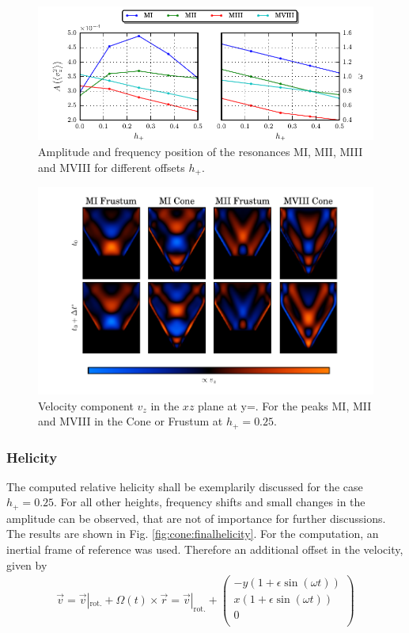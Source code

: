 \begin{figure}[!tp]
  \centering
  \includegraphics{gfx/cone/final/amp_pos.pdf}
  \caption{
      \label{fig:cone:finalampmax}Amplitude and frequency position of the resonances M\RN{1}, M\RN{2}, M\RN{3} and M\RN{8}
      for different offsets $h_+$.
    }
\end{figure}
\begin{figure}[!bp]
  \centering
  \includegraphics{gfx/cone/final/modes.pdf}
  \caption{
      \label{fig:cone:finalmodesexp}
      Velocity component $v_z$ in the $xz$ plane at y=.
       For the peaks M\RN{1}, M\RN{2} and M\RN{8} in the Cone or Frustum at $h_+=0.25$.
    }
\end{figure}
\clearpage

\subsubsection{Helicity}

The computed relative helicity shall be exemplarily discussed for  the case ${h_+=0.25}$.
For all other heights, frequency shifts and small changes in the amplitude can be observed,
that are not of importance for further discussions.
The results are shown in Fig. \ref{fig:cone:finalhelicity}.
For the computation, an inertial frame of reference was used.
Therefore an additional offset in the velocity,  given by
\begin{align}
    \vec{v} = \vec{v}|_{\text{rot.}} + \Omega(t) \times \vec{r} = \vec{v}|_{\text{rot.}} +
     \begin{pmatrix}
           -y (1 + \epsilon \sin(\omega t)) \\
           x ( 1 + \epsilon \sin(\omega t)) \\
           0\\
         \end{pmatrix}
\end{align}

